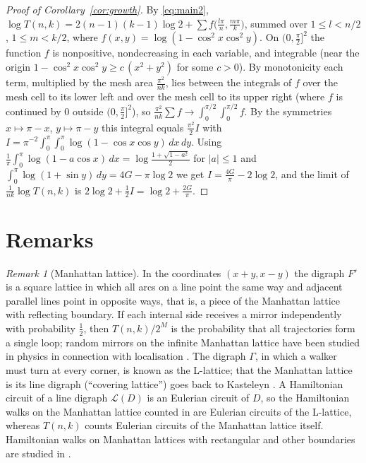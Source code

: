 \documentclass[11pt,a4paper]{amsart}
\theoremstyle{remark}
\newtheorem{remark}[theorem]{Remark}
\newcommand{\G}{\Gamma}
\begin{document}
\begin{proof}[Proof of Corollary~\ref{cor:growth}]
By \eqref{eq:main2}, $\log T(n,k)=2(n-1)(k-1)\log 2+\sum f\bigl(\frac{l\pi}{n},\frac{m\pi}{k}\bigr)$, summed over
$1\le l<n/2$, $1\le m<k/2$, where $f(x,y)=\log(1-\cos^2x\cos^2y)$. On $(0,\frac\pi2]^2$ the function $f$ is
nonpositive, nondecreasing in each variable, and integrable (near the origin $1-\cos^2x\cos^2y\ge c\,(x^2+y^2)$ for
some $c>0$). By monotonicity each term, multiplied by the mesh area $\frac{\pi^2}{nk}$, lies between the integrals of
$f$ over the mesh cell to its lower left and over the mesh cell to its upper right (where $f$ is continued by $0$
outside $(0,\frac\pi2]^2$), so $\frac{\pi^2}{nk}\sum f\to\int_0^{\pi/2}\!\!\int_0^{\pi/2}f$. By the symmetries
$x\mapsto\pi-x$, $y\mapsto\pi-y$ this integral equals $\frac{\pi^2}{2}I$ with
$I=\pi^{-2}\int_0^\pi\!\!\int_0^\pi\log(1-\cos x\cos y)\,dx\,dy$. Using
$\frac1\pi\int_0^\pi\log(1-a\cos x)\,dx=\log\frac{1+\sqrt{1-a^2}}{2}$ for $|a|\le1$ and
$\int_0^{\pi}\log(1+\sin y)\,dy=4G-\pi\log2$ we get $I=\frac{4G}{\pi}-2\log 2$, and the limit of $\frac{1}{nk}\log T(n,k)$ is
$2\log2+\frac12 I=\log 2+\frac{2G}{\pi}$.
\end{proof}

\section{Remarks}

\begin{remark}[Manhattan lattice]\label{rem:manhattan}
In the coordinates $(x+y,x-y)$ the digraph $F'$ is a square lattice in which all arcs on a line point the same way
and adjacent parallel lines point in opposite ways, that is, a piece of the Manhattan lattice with reflecting
boundary. If each internal side receives a mirror independently with probability $\frac12$, then $T(n,k)/2^{M}$ is
the probability that all trajectories form a single loop; random mirrors on the infinite Manhattan lattice have
been studied in physics in connection with localisation \cite{BOC}. The digraph $\G$, in which a walker must turn
at every corner, is known as the L-lattice; that the Manhattan lattice is its line digraph (``covering lattice'')
goes back to Kasteleyn \cite{Kasteleyn}. A Hamiltonian circuit of a line digraph $\mathcal L(D)$ is an Eulerian
circuit of $D$, so the Hamiltonian walks on the Manhattan lattice counted in \cite{Kasteleyn} are Eulerian circuits
of the L-lattice, whereas $T(n,k)$ counts Eulerian circuits of the Manhattan lattice itself. Hamiltonian walks on
Manhattan lattices with rectangular and other boundaries are studied in \cite{DD}.
\end{remark}
\end{document}
